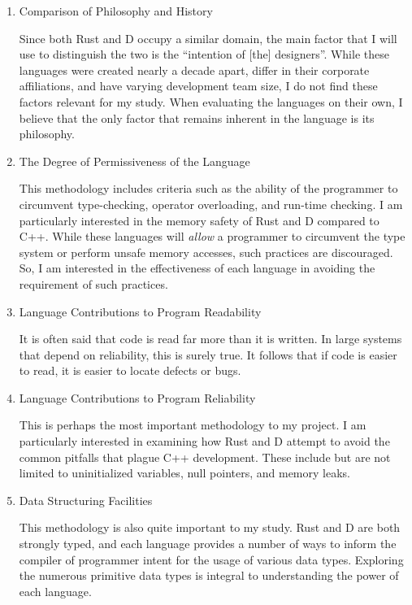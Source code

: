 \documentclass[draftcopy]{srpaper}
\begin{document}
\begin{enumerate}
\item Comparison of Philosophy and History

Since both Rust and D occupy a similar domain, the main factor that I will use
to distinguish the two is the ``intention of [the] designers''. While these
languages were created nearly a decade apart, differ in their corporate
affiliations, and have varying development team size, I do not find these
factors relevant for my study. When evaluating the languages on their own, I
believe that the only factor that remains inherent in the language is its
philosophy.

\item The Degree of Permissiveness of the Language

This methodology includes criteria such as the ability of the programmer to
circumvent type-checking, operator overloading, and run-time checking. I am
particularly interested in the memory safety of Rust and D compared to C++.
While these languages will \textit{allow} a programmer to circumvent the type
system or perform unsafe memory accesses, such practices are discouraged. So,
I am interested in the effectiveness of each language in avoiding the
requirement of such practices.

\item Language Contributions to Program Readability

It is often said that code is read far more than it is written. In large
systems that depend on reliability, this is surely true. It follows that if
code is easier to read, it is easier to locate defects or bugs.

\item Language Contributions to Program Reliability

This is perhaps the most important methodology to my project. I am particularly
interested in examining how Rust and D attempt to avoid the common pitfalls
that plague C++ development. These include but are not limited to uninitialized
variables, null pointers, and memory leaks.

\item Data Structuring Facilities

This methodology is also quite important to my study. Rust and D are both
strongly typed, and each language provides a number of ways to inform the
compiler of programmer intent for the usage of various data types. Exploring
the numerous primitive data types is integral to understanding the power of
each language.


\end{enumerate}
\end{document}
